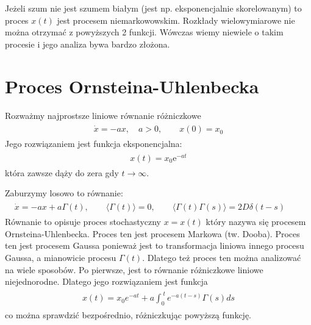 \documentclass[a4paper,12pt,polish]{sphinxmanual}
\begin{document}
Jeżeli szum nie jest szumem białym (jest np. eksponencjalnie skorelowanym) to proces $x(t)$ jest procesem niemarkowowskim. Rozkłady wielowymiarowe nie można otrzymać z powyższych 2 funkcji. Wówczas wiemy niewiele o takim procesie i jego analiza bywa bardzo złożona.


\section{Proces Ornsteina-Uhlenbecka}
\label{ch3/chIII032:proces-ornsteina-uhlenbecka}\label{ch3/chIII032::doc}
Rozważmy najprostsze liniowe równanie różniczkowe
\label{ch3/chIII032:equation-eqn1}\begin{gather}
\begin{split}\dot x = - ax, \quad a>0, \qquad x(0) = x_0\end{split}\label{ch3/chIII032-eqn1}
\end{gather}
Jego rozwiązaniem jest funkcja eksponencjalna:
\label{ch3/chIII032:equation-eqn2}\begin{gather}
\begin{split}x(t) = x_0 \mbox{e}^{-at}\end{split}\label{ch3/chIII032-eqn2}
\end{gather}
która zawsze dąży do zera gdy $t \to \infty$.

Zaburzymy losowo to równanie:
\label{ch3/chIII032:equation-eqn3}\begin{gather}
\begin{split}\dot x = - ax + a \Gamma(t), \qquad \langle \Gamma(t)\rangle = 0, \qquad \langle \Gamma(t) \Gamma(s)\rangle = 2D \delta(t-s) \qquad\end{split}\label{ch3/chIII032-eqn3}
\end{gather}
Równanie to opisuje proces stochastyczny $x=x(t)$ który nazywa się procesem Ornsteina-Uhlenbecka. Proces ten jest procesem Markowa (tw. Dooba). Proces ten jest procesem Gaussa ponieważ jest to transformacja liniowa innego procesu Gaussa, a mianowicie procesu $\Gamma(t)$. Dlatego też proces ten można analizować na wiele sposobów. Po pierwsze, jest to równanie różniczkowe liniowe niejednorodne. Dlatego jego rozwiązaniem jest funkcja
\label{ch3/chIII032:equation-eqn4}\begin{gather}
\begin{split}x(t) = x_0 e^{-at} + a \int_0^{\; t} e^{-a(t-s)} \Gamma(s) ds\end{split}\label{ch3/chIII032-eqn4}
\end{gather}
co można sprawdzić bezpośrednio, różniczkując powyższą funkcję.
\end{document}
